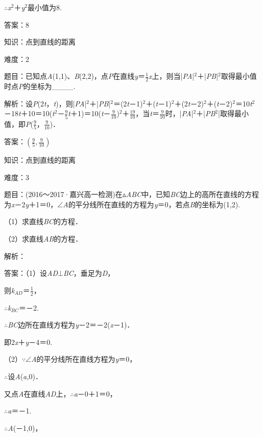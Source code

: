 \documentclass{article} %
\begin{document}
$\mathrm{\therefore}$\textit{x}${}^{2}$＋\textit{y}${}^{2}$最小值为8.

答案：8

知识：点到直线的距离

难度：2

题目：已知点\textit{A}(1,1)、\textit{B}(2,2)，点\textit{P}在直线\textit{y}＝$\frac{1}{2}$\textit{x}上，则当|\textit{PA}|${}^{2}$＋|\textit{PB}|${}^{2}$取得最小值时点\textit{P}的坐标为\_\_\_\_.

解析：设\textit{P}(2\textit{t}，\textit{t})，则|\textit{PA}|${}^{2}$＋|\textit{PB}|${}^{2}$＝(2\textit{t}－1)${}^{2}$＋(\textit{t}－1)${}^{2}$＋(2\textit{t}－2)${}^{2}$＋(\textit{t}－2)${}^{2}$＝10\textit{t}${}^{2}$－18\textit{t}＋10＝10(\textit{t}${}^{2}$－$\frac{9}{5}$\textit{t}＋1)＝10(\textit{t}－$\frac{9}{10}$)${}^{2}$＋$\frac{19}{10}$，当\textit{t}＝$\frac{9}{10}$时，|\textit{PA}|${}^{2}$＋|\textit{PB}${}^{2}$|取得最小值，即\textit{P}($\frac{9}{5}$，$\frac{9}{10}$)．

答案：$(\frac{9}{5}, \frac{9}{10})$

知识：点到直线的距离

难度：3

题目：(2016～2017·嘉兴高一检测)在$\mathrm{\vartriangle}$\textit{ABC}中，已知\textit{BC}边上的高所在直线的方程为\textit{x}－2\textit{y}＋1＝0，$\mathrm{\angle}$\textit{A}的平分线所在直线的方程为\textit{y}＝0，若点\textit{B}的坐标为(1,2).

（1）求直线\textit{BC}的方程．

（2）求直线\textit{AB}的方程．

解析：

答案：（1）设\textit{AD}$\mathrm{\bot}$\textit{BC}，垂足为\textit{D}，

则\textit{k${}_{AD}$}＝$\frac{1}{2}$，

$\mathrm{\therefore}$\textit{k${}_{BC}$}＝－2.

$\mathrm{\therefore}$\textit{BC}边所在直线方程为\textit{y}－2＝－2(\textit{x}－1)．

即2\textit{x}＋\textit{y}－4＝0.

（2）$\mathrm{\because}$$\mathrm{\angle}$\textit{A}的平分线所在直线方程为\textit{y}＝0，

$\mathrm{\therefore}$设\textit{A}(\textit{a,}0)．

又点\textit{A}在直线\textit{AD}上，$\mathrm{\therefore}$\textit{a}－0＋1＝0，

$\mathrm{\therefore}$\textit{a}＝－1.

$\mathrm{\therefore}$\textit{A}(－1,0)，
\end{document}
